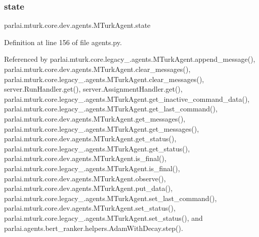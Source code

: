 \subsubsection{\texorpdfstring{state}{state}}
{\footnotesize\ttfamily parlai.\+mturk.\+core.\+dev.\+agents.\+M\+Turk\+Agent.\+state}



Definition at line 156 of file agents.\+py.



Referenced by parlai.\+mturk.\+core.\+legacy\+\_.\+agents.\+M\+Turk\+Agent.\+append\+\_\+message(), parlai.\+mturk.\+core.\+dev.\+agents.\+M\+Turk\+Agent.\+clear\+\_\+messages(), parlai.\+mturk.\+core.\+legacy\+\_.\+agents.\+M\+Turk\+Agent.\+clear\+\_\+messages(), server.\+Run\+Handler.\+get(), server.\+Assignment\+Handler.\+get(), parlai.\+mturk.\+core.\+legacy\+\_.\+agents.\+M\+Turk\+Agent.\+get\+\_\+inactive\+\_\+command\+\_\+data(), parlai.\+mturk.\+core.\+legacy\+\_.\+agents.\+M\+Turk\+Agent.\+get\+\_\+last\+\_\+command(), parlai.\+mturk.\+core.\+dev.\+agents.\+M\+Turk\+Agent.\+get\+\_\+messages(), parlai.\+mturk.\+core.\+legacy\+\_.\+agents.\+M\+Turk\+Agent.\+get\+\_\+messages(), parlai.\+mturk.\+core.\+dev.\+agents.\+M\+Turk\+Agent.\+get\+\_\+status(), parlai.\+mturk.\+core.\+legacy\+\_.\+agents.\+M\+Turk\+Agent.\+get\+\_\+status(), parlai.\+mturk.\+core.\+dev.\+agents.\+M\+Turk\+Agent.\+is\+\_\+final(), parlai.\+mturk.\+core.\+legacy\+\_.\+agents.\+M\+Turk\+Agent.\+is\+\_\+final(), parlai.\+mturk.\+core.\+dev.\+agents.\+M\+Turk\+Agent.\+observe(), parlai.\+mturk.\+core.\+dev.\+agents.\+M\+Turk\+Agent.\+put\+\_\+data(), parlai.\+mturk.\+core.\+legacy\+\_.\+agents.\+M\+Turk\+Agent.\+set\+\_\+last\+\_\+command(), parlai.\+mturk.\+core.\+dev.\+agents.\+M\+Turk\+Agent.\+set\+\_\+status(), parlai.\+mturk.\+core.\+legacy\+\_.\+agents.\+M\+Turk\+Agent.\+set\+\_\+status(), and parlai.\+agents.\+bert\+\_\+ranker.\+helpers.\+Adam\+With\+Decay.\+step().

\mbox{\label{classparlai_1_1mturk_1_1core_1_1dev_1_1agents_1_1MTurkAgent_a1d8921d02c97bbb26b946482c4c5b029}} 
